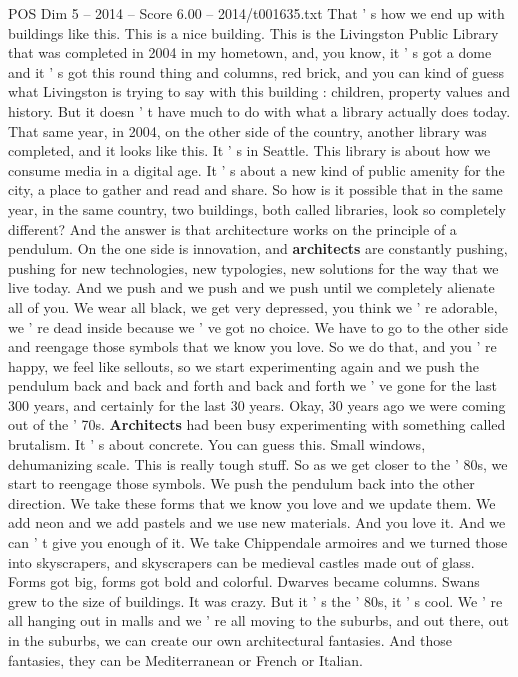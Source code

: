 \begin{textsample}{POS Dim 5 – 2014 – Score 6.00 – 2014/t001635.txt}
That ' s how we end up with buildings like this.
This is a nice building.
This is the Livingston Public Library that was completed in 2004 in my hometown, and, you know, it ' s got a dome and it ' s got this round thing and columns, red brick, and you can kind of guess what Livingston is trying to say with this building : children, property values and history.
But it doesn ' t have much to do with what a library actually does today.
That same year, in 2004, on the other side of the country, another library was completed, and it looks like this.
It ' s in Seattle.
This library is about how we consume media in a digital age.
It ' s about a new kind of public amenity for the city, a place to gather and read and share.
So how is it possible that in the same year, in the same country, two buildings, both called libraries, look so completely different?
And the answer is that architecture works on the principle of a pendulum.
On the one side is innovation, and \textbf{architects} are constantly pushing, pushing for new technologies, new typologies, new solutions for the way that we live today.
And we push and we push and we push until we completely alienate all of you.
We wear all black, we get very depressed, you think we ' re adorable, we ' re dead inside because we ' ve got no choice.
We have to go to the other side and reengage those symbols that we know you love.
So we do that, and you ' re happy, we feel like sellouts, so we start experimenting again and we push the pendulum back and back and forth and back and forth we ' ve gone for the last 300 years, and certainly for the last 30 years.
Okay, 30 years ago we were coming out of the ' 70s. \textbf{Architects} had been busy experimenting with something called brutalism.
It ' s about concrete.
You can guess this.
Small windows, dehumanizing scale.
This is really tough stuff.
So as we get closer to the ' 80s, we start to reengage those symbols.
We push the pendulum back into the other direction.
We take these forms that we know you love and we update them.
We add neon and we add pastels and we use new materials.
And you love it.
And we can ' t give you enough of it.
We take Chippendale armoires and we turned those into skyscrapers, and skyscrapers can be medieval castles made out of glass.
Forms got big, forms got bold and colorful.
Dwarves became columns.
Swans grew to the size of buildings.
It was crazy.
But it ' s the ' 80s, it ' s cool.
We ' re all hanging out in malls and we ' re all moving to the suburbs, and out there, out in the suburbs, we can create our own architectural fantasies.
And those fantasies, they can be Mediterranean or French or Italian.

\end{textsample}
